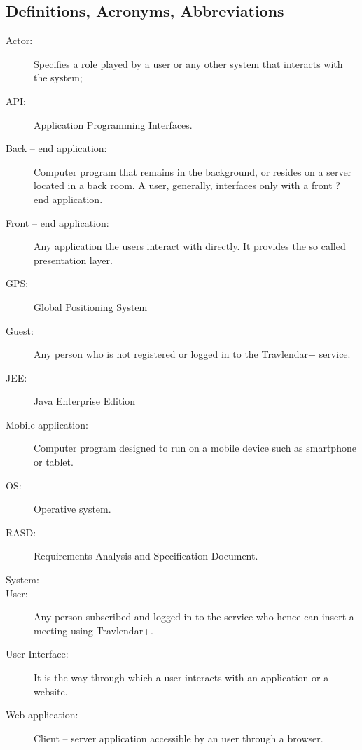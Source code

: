 \documentclass{article}
\begin{document}
	
	\subsection{Definitions, Acronyms, Abbreviations}
	\begin{description}
	\item[Actor:] Specifies a role played by a user or any other system that interacts with the system;
	\item[API: ]Application Programming Interfaces.
	\item[Back -- end application:] Computer program that remains in the background, or resides on a server located in a back room. A user, generally, interfaces only with a front ? end application.
	\item[Front -- end application:] Any application the users interact with directly. It provides the so called presentation layer.
	\item[GPS:] Global Positioning System
	\item[Guest:] Any person who is not registered or logged in to the Travlendar+ service.
	\item[JEE:] Java Enterprise Edition
	\item[Mobile application:] Computer program designed to run on a mobile device such as smartphone or tablet.
	\item[OS:] Operative system.
	\item[RASD:] Requirements Analysis and Specification Document.
	\item[System:]
	\item[User:] Any person subscribed and logged in to the service who hence can insert a meeting using Travlendar+.
	\item[User Interface:] It is the way through which a user interacts with an application or a website.
	\item[Web application:] Client -- server application accessible by an user through a browser.
	\end{description}
	
	
\end{document}
